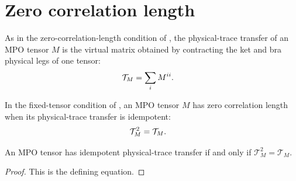 \section{Zero correlation length}

\begin{definition}
    \label{def:mpo_physical_trace_transfer}
    \leanok
    As in the zero-correlation-length condition of
    \cite[Definition~4.2, lines~735--739]{Cirac2016MPDO_arXiv}, the
    physical-trace transfer of an MPO tensor $M$ is the virtual matrix
    obtained by contracting the ket and bra physical legs of one tensor:
    \begin{align}
        \mathcal T_M
         & =\sum_i M^{ii}.
        \notag
    \end{align}
\end{definition}

\begin{definition}
    \label{def:mpo_physical_trace_idempotence}
    \leanok
    In the fixed-tensor condition of
    \cite[Definition~4.2, lines~735--739]{Cirac2016MPDO_arXiv}, an MPO tensor
    $M$ has zero correlation length when its physical-trace transfer is
    idempotent:
    \begin{align}
        \mathcal T_M^2 & = \mathcal T_M.
        \notag
    \end{align}
\end{definition}

\begin{lemma}
    \label{thm:mpo_physical_trace_idempotence_iff}
    \leanok
    An MPO tensor has idempotent physical-trace transfer if and only if
    $\mathcal T_M^2=\mathcal T_M$.
\end{lemma}

\begin{proof}
    \leanok
    This is the defining equation.
\end{proof}

